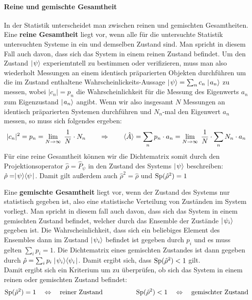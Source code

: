\paragraph{Reine und gemischte Gesamtheit}

In der Statistik unterscheidet man zwischen reinen und gemischten Gesamtheiten. Eine {\bf reine Gesamtheit} liegt vor, wenn alle für die untersuchte Statistik untersuchten Systeme in ein und demselben Zustand sind. Man spricht in diesem Fall auch davon, dass sich das System in einem reinen Zustand befindet. Um den Zustand $\mid\!\!\!\,\,{\psi}\rangle$ experiemtntell zu bestimmen oder verifizieren, muss man also wiederholt Messungen an einem identisch präparierten Objekten durchführen um die im Zustand enthaltene Wahrscheinlickeits-Aussage $\mid\!\!\!\,\,{\psi}\rangle=\sum_n c_n \mid\!\!\!\,\,{a_n}\rangle$ zu messen, wobei $|c_n|=p_n$ die Wahrscheinlichkeit für die Messung des Eigenwerts $a_n$ zum Eigenzustand $\mid\!\!\!\,\,{a_n}\rangle$ angibt. Wenn wir also insgesamt $N$ Messungen an identisch präparierten Systemen durchführen und $N_n$-mal den Eigenwert $a_n$ messen, so muss sich folgendes ergeben: 
\begin{eqnarray*}
	|c_n|^2 = p_n = \lim_{N\to\infty}\;\frac{1}{N}\cdot N_n \qquad\Rightarrow\qquad \langle\!\!\,\,\hat{A}\!\!\,\,\rangle = \sum_n p_n\cdot a_n = \lim_{N\to\infty}\; \frac{1}{N}\cdot\sum_n N_n\cdot a_n
\end{eqnarray*}
Für eine reine Gesamtheit können wir die Dichtematrix somit durch den Projektionsoperator $\hat{\rho}=\hat{P}_{\psi}$ in den Zustand des Systems $\mid\!\!\!\,\,{\psi}\rangle$ beschreiben: $\hat{\rho}=\mid\!\!\!\,\,{\psi}\rangle\langle{\psi}\!\!\!\,\,\mid$. Damit gilt außerdem auch $\hat{\rho}^2=\hat{\rho}$ und $\text{Sp}(\hat{\rho}^2)=1$

Eine {\bf gemischte Gesamtheit} liegt vor, wenn der Zustand des Systems nur statistisch gegeben ist, also eine statistische Verteilung von Zuständen im System vorliegt. Man spricht in diesem fall auch davon, dass sich das System in einem gemischten Zustand befindet, welcher durch das Ensemble der Zustände $\mid\!\!\!\,\,{\psi_i}\rangle$ gegeben ist. Die Wahrscheinlichkeit, dass sich ein beliebiges Element des Ensembles dann im Zustand $\mid\!\!\!\,\,{\psi_i}\rangle$ befindet ist gegeben durch $p_i$ und es muss gelten $\sum_i p_i=1$. Die Dichtematrix eines gemischten Zustandes ist dann gegeben durch $\hat{\rho}=\sum_i p_i \mid\!\!\!\,\,{\psi_i}\rangle\langle{\psi_i}\!\!\!\,\,\mid$. Damit ergibt sich, dass $\text{Sp}(\hat{\rho}^2)<1$ gilt. \\ 

Damit ergibt sich ein Kriterium um zu überprüfen, ob sich das System in einem reinen oder gemischten Zustand befindet: 
\begin{eqnarray*}
	\text{Sp}(\hat{\rho}^2) = 1 \quad\Leftrightarrow\quad\text{reiner Zustand} &\qquad\qquad& \text{Sp}(\hat{\rho}^2)<1 \quad\Leftrightarrow\quad\text{gemischter Zustand}
\end{eqnarray*}


